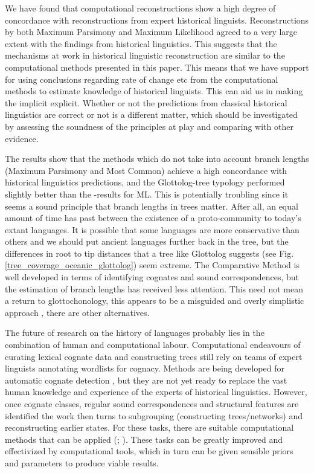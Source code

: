 \documentclass[a4paper,10pt]{article} %
\begin{document}
We have found that computational reconstructions show a high degree of concordance with reconstructions from expert historical linguists. Reconstructions by both Maximum Parsimony and Maximum Likelihood agreed to a very large extent with the findings from historical linguistics. This suggests that the mechanisms at work in historical linguistic reconstruction are similar to the computational methods presented in this paper. This means that we have support for using conclusions regarding rate of change etc from the computational methods to estimate knowledge of historical linguists. This can aid us in making the implicit explicit. Whether or not the predictions from classical historical linguistics are correct or not is a different matter, which should be investigated by assessing the soundness of the principles at play and comparing with other evidence.

The results show that the methods which do not take into account branch lengths (Maximum Parsimony and Most Common) achieve a high concordance with historical linguistics predictions, and the Glottolog-tree typology performed slightly better than the \citet{grayetal_2009}-results for ML. This is potentially troubling since it seems a sound principle that branch lengths in trees matter. After all, an equal amount of time has past between the existence of a proto-community to today's extant languages. It is possible that some languages are more conservative than others and we should put ancient languages further back in the tree, but the differences in root to tip distances that a tree like Glottolog suggests (see Fig. \ref{tree_coverage_oceanic_glottolog}) seem extreme. The Comparative Method is well developed in terms of identifying cognates and sound correspondences, but the estimation of branch lengths has received less attention. This need not mean a return to glottochonology, this appears to be a misguided and overly simplistic approach \citep[371]{greenhill2015evolution}, there are other alternatives.

The future of research on the history of languages probably lies in the combination of human and computational labour. Computational endeavours of curating lexical cognate data \citep{list2022lexibank} and constructing trees \citep{grayetal_2009} still rely on teams of expert linguists annotating wordlists for cognacy. Methods are being developed for automatic cognate detection \citep{list2017potential}, but they are not yet ready to replace the vast human knowledge and experience of the experts of historical linguistics. However, once cognate classes, regular sound correspondences and structural features are identified the work then turns to subgrouping (constructing trees/networks) and reconstructing earlier states. For these tasks, there are suitable computational methods that can be applied (\citet{greenhill2015evolution}; \citet{gray_greenhill_defend_bayes}). These tasks can be greatly improved and effectivized by computational tools, which in turn can be given sensible priors and parameters to produce viable results.
\end{document}
